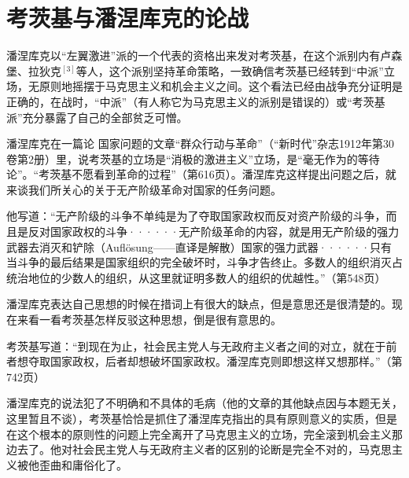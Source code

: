 \chapter{考茨基与潘涅库克的论战} %

潘涅库克以“左翼激进”派的一个代表的资格出来发对考茨基，在这个派别内有卢森堡、拉狄克$^{[3]}$等人，这个派别坚持革命策略，一致确信考茨基已经转到“中派”立场，无原则地摇摆于马克思主义和机会主义之间。这个看法已经由战争充分证明是正确的，在战时，“中派”（有人称它为马克思主义的派别是错误的）或“考茨基派”充分暴露了自己的全部贫乏可憎。

潘涅库克在一篇论 国家问题的文章“群众行动与革命”（“新时代”杂志1912年第30卷第2册）里，说考茨基的立场是“消极的激进主义”立场，是“毫无作为的等待论”。“考茨基不愿看到革命的过程”（第616页）。潘涅库克这样提出问题之后，就来谈我们所关心的关于无产阶级革命对国家的任务问题。

\pskip
\leftskip=10mm
\small

他写道：“无产阶级的斗争不单纯是{\kaishu 为了夺取}国家政权而反对资产阶级的斗争，而且是{\kaishu 反对}国家政权的斗争······\quad 无产阶级革命的内容，就是用无产阶级的强力武器去消灭和铲除（Aufl\"{o}sung——直译是解散）国家的强力武器······\quad 只有当斗争的最后结果是国家组织的完全破坏时，斗争才告终止。多数人的组织消灭占统治地位的少数人的组织，从这里就证明多数人的组织的优越性。”（第548页）

\pskip 
\leftskip=0mm
\normalsize

潘涅库克表达自己思想的时候在措词上有很大的缺点，但是意思还是很清楚的。现在来看一看考茨基{\kaishu 怎样}反驳这种思想，倒是很有意思的。

\pskip
\leftskip=10mm
\small

考茨基写道：“到现在为止，社会民主党人与无政府主义者之间的对立，就在于前者想夺取国家政权，后者却想破坏国家政权。潘涅库克则即想这样又想那样。”（第742页）

\pskip 
\leftskip=0mm
\normalsize

潘涅库克的说法犯了不明确和不具体的毛病（他的文章的其他缺点因与本题无关，这里暂且不谈），考茨基恰恰是抓住了潘涅库克指出的{\kaishu 具有原则意义}的实质，但是在这个{\kaishu 根本的原则性}的问题上完全离开了马克思主义的立场，完全滚到机会主义那边去了。他对社会民主党人与无政府主义者的区别的论断是完全不对的，马克思主义被他歪曲和庸俗化了。

